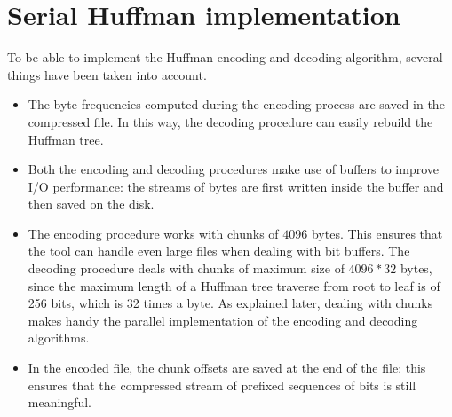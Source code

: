 \section{Serial Huffman implementation}
To be able to implement the Huffman encoding and decoding algorithm, several things have been taken into account.
\begin{itemize}
    \item The byte frequencies computed during the encoding process are saved in the compressed file. In this way, the decoding procedure can easily rebuild the Huffman tree.
    \item Both the encoding and decoding procedures make use of buffers to improve I/O performance: the streams of bytes are first written inside the buffer and then saved on the disk.
    \item The encoding procedure works with chunks of \(4096\) bytes. This ensures that the tool can handle even large files when dealing with bit buffers. The decoding procedure deals with chunks of maximum size of \(4096*32\) bytes, since the maximum length of a Huffman tree traverse from root to leaf is of 256 bits, which is 32 times a byte. As explained later, dealing with chunks makes handy the parallel implementation of the encoding and decoding algorithms.
    \item In the encoded file, the chunk offsets are saved at the end of the file: this ensures that the compressed stream of prefixed sequences of bits is still meaningful.
\end{itemize}
